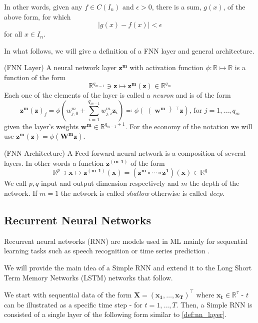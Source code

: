 \documentclass[a4paper, oneside]{discothesis}
\begin{document}
In other words, given any $f\in C(I_n)$ and $\epsilon >0$, there is a sum, $g(x)$, of the above form, for which
\begin{equation}
|g(x)-f(x)|<\epsilon
\end{equation}
for all $x\in I_n$.

In what follows, we will give a definition of a FNN layer and general architecture.

 (FNN Layer) \label{def:nn_layer}A neural network layer $\bm{z^m}$ with activation function $\phi:\mathbb{R}\mapsto\mathbb{R}$ is a function of the form
\begin{equation}
\mathbb{R}^{q_{m-1}}\ni \bm{z} \longmapsto \bm{z^m}(\bm{z}) \in \mathbb{R}^{q_{m}}
\end{equation}
Each one of the elements of the layer is called a \textit{neuron} and is of the form
\begin{equation}
\bm{z^m}(\bm{z})_j = \phi \left(w_{j,0}^m+\sum_{i=1}^{q_{m-1}}w_{j,i}^m\bm{z}_i\right)\eqqcolon\phi\left(\right(\bm{w^m}\left) ^\intercal\bm{z}\right)\text{, for } j = 1, \dots, q_m
\end{equation}
given the layer's weights $\bm{w^m}\in \mathbb{R}^{q_{m-1}+1}$. For the economy of the notation we will use $\bm{z^m}(\bm{z}) = \phi \left(\bm{W^m z} \right)$.

 (FNN Architecture) A Feed-forward neural network is a composition of several layers. In other words a function $\bm{z^{(m:1)}}$ of the form
\begin{equation}
\mathbb{R}^p\ni \bm{x} \longmapsto \bm{z^{(m:1)}}(\bm{x}) = \left(\bm{z^m}\circ\cdots\circ\bm{z^1}\right)(\bm{x})\in \mathbb{R}^q
\end{equation}
We call $p, q$ input and output dimension respectively and $m$ the depth of the network. If $m=1$ the network is called \textit{shallow} otherwise is called \textit{deep}.

\subsection{Recurrent Neural Networks}
Recurrent neural networks (RNN) are models used in ML mainly for sequential learning tasks such as speech recognition \cite{speechRNN} or time series prediction \cite{Hewamalage_2021}. 

We will provide the main idea of a Simple RNN and extend it to the Long Short Term Memory Networks (LSTM) networks that follow.

We start with sequential data of the form $\bm{X} = \left(\bm{x_1}, \dots, \bm{x_T}\right)^\intercal $ where $\bm{x_t}\in\mathbb{R}^{\tau}$ - $t$ can be illustrated as a specific time step -  for $t = 1, \dots, T$. Then, a Simple RNN is consisted of a single layer of the following form similar to \ref{def:nn_layer}. 
\end{document}
